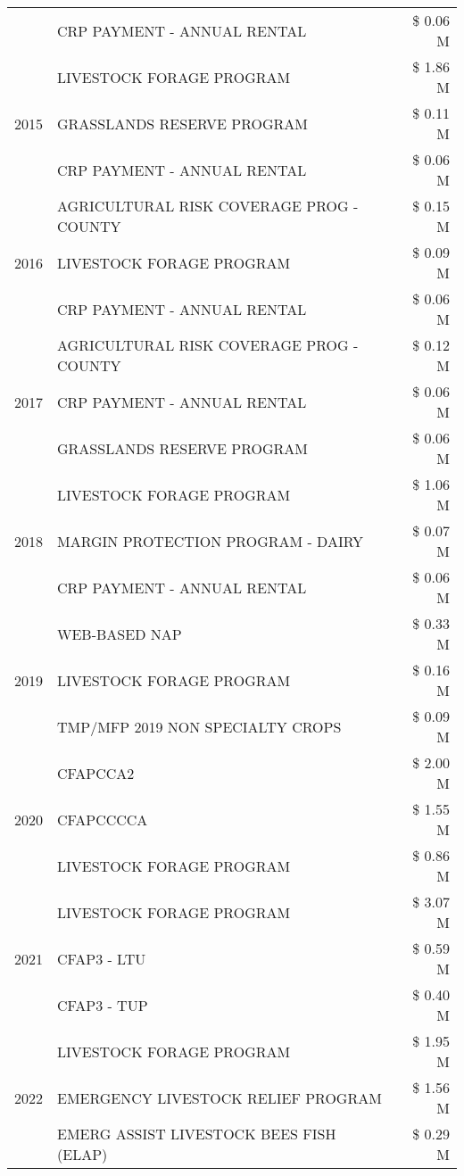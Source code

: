 \begin{tabular}{llr}
 & CRP PAYMENT - ANNUAL RENTAL & \$ 0.06 M \\
\cline{1-3}
\multirow[t]{3}{*}{2015} & LIVESTOCK FORAGE PROGRAM & \$ 1.86 M \\
 & GRASSLANDS RESERVE PROGRAM & \$ 0.11 M \\
 & CRP PAYMENT - ANNUAL RENTAL & \$ 0.06 M \\
\cline{1-3}
\multirow[t]{3}{*}{2016} & AGRICULTURAL RISK COVERAGE PROG - COUNTY & \$ 0.15 M \\
 & LIVESTOCK FORAGE PROGRAM & \$ 0.09 M \\
 & CRP PAYMENT - ANNUAL RENTAL & \$ 0.06 M \\
\cline{1-3}
\multirow[t]{3}{*}{2017} & AGRICULTURAL RISK COVERAGE PROG - COUNTY & \$ 0.12 M \\
 & CRP PAYMENT - ANNUAL RENTAL & \$ 0.06 M \\
 & GRASSLANDS RESERVE PROGRAM & \$ 0.06 M \\
\cline{1-3}
\multirow[t]{3}{*}{2018} & LIVESTOCK FORAGE PROGRAM & \$ 1.06 M \\
 & MARGIN PROTECTION PROGRAM - DAIRY & \$ 0.07 M \\
 & CRP PAYMENT - ANNUAL RENTAL & \$ 0.06 M \\
\cline{1-3}
\multirow[t]{3}{*}{2019} & WEB-BASED NAP & \$ 0.33 M \\
 & LIVESTOCK FORAGE PROGRAM & \$ 0.16 M \\
 & TMP/MFP 2019 NON SPECIALTY CROPS & \$ 0.09 M \\
\cline{1-3}
\multirow[t]{3}{*}{2020} & CFAPCCA2 & \$ 2.00 M \\
 & CFAPCCCCA & \$ 1.55 M \\
 & LIVESTOCK FORAGE PROGRAM & \$ 0.86 M \\
\cline{1-3}
\multirow[t]{3}{*}{2021} & LIVESTOCK FORAGE PROGRAM & \$ 3.07 M \\
 & CFAP3 - LTU & \$ 0.59 M \\
 & CFAP3 - TUP & \$ 0.40 M \\
\cline{1-3}
\multirow[t]{3}{*}{2022} & LIVESTOCK FORAGE PROGRAM & \$ 1.95 M \\
 & EMERGENCY LIVESTOCK RELIEF PROGRAM & \$ 1.56 M \\
 & EMERG ASSIST LIVESTOCK BEES FISH (ELAP) & \$ 0.29 M \\
\cline{1-3}
\bottomrule
\end{tabular}
